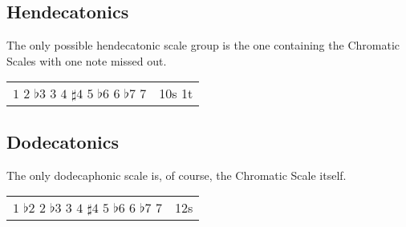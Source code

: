 \documentclass[english]{./gbook}
\begin{document}
\begin{large}
\subsection*{Hendecatonics}

The only possible hendecatonic scale group is the one containing the Chromatic Scales with one note missed out.

\begin{tabular}{ll}
    $1$ $2$ $\flat3$ $3$ $4$ $\sharp4$ $5$ $\flat6$ $6$ $\flat7$ $7$   &   10s 1t      
\end{tabular}


\subsection*{Dodecatonics}

The only dodecaphonic scale is, of course, the Chromatic Scale itself.

\begin{tabular}{ll}
    $1$ $\flat2$ $2$ $\flat3$ $3$ $4$ $\sharp4$ $5$ $\flat6$ $6$ $\flat7$ $7$   &   12s      
\end{tabular}








\end{large}
\end{document}
